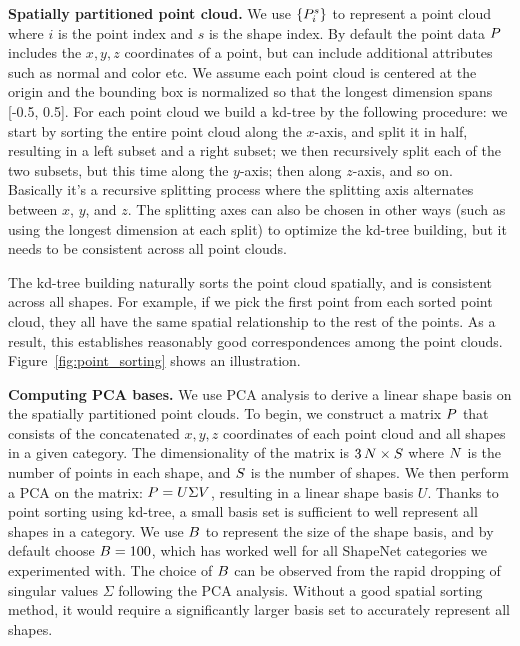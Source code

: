 \vspace{4pt}
\noindent \textbf{Spatially partitioned point cloud.} We use $\{P_i^s\}$ to represent a point cloud where $i$ is the point index and $s$ is the shape index. By default the point data $P$ includes the $x,y,z$ coordinates of a point, but can include additional attributes such as normal and color etc. We assume each point cloud is centered at the origin and the bounding box is normalized so that the longest dimension spans [-0.5, 0.5]. For each point cloud we build a kd-tree by the following procedure: we start by sorting the entire point cloud along the $x$-axis, and split it in half, resulting in a left subset and a right subset; we then recursively split each of the two subsets, but this time along the $y$-axis; then along $z$-axis, and so on. Basically it's a recursive splitting process where the splitting axis alternates between $x$, $y$, and $z$. The splitting axes can also be chosen in other ways (such as using the longest dimension at each split) to optimize the kd-tree building, but it needs to be consistent across all point clouds.

The kd-tree building naturally sorts the point cloud spatially, and is consistent across all shapes. For example, if we pick the first point from each sorted point cloud, they all have the same spatial relationship to the rest of the points. As a result, this establishes reasonably good correspondences among the point clouds. Figure~\ref{fig:point_sorting} shows an illustration.

\noindent \textbf{Computing PCA bases.} We use PCA analysis to derive a linear shape basis on the spatially partitioned point clouds. To begin, we construct a matrix $P$ that consists of the concatenated $x,y,z$ coordinates of each point cloud and all shapes in a given category. The dimensionality of the matrix is $3\,N\times S$ where $N$ is the number of points in each shape, and $S$ is the number of shapes. We then perform a PCA on the matrix: $P=U \Sigma V$, resulting in a linear shape basis $U$. Thanks to point sorting using kd-tree, a small basis set is sufficient to well represent all shapes in a category. We use $B$ to represent the size of the shape basis, and by default choose $B=100$, which has worked well for all ShapeNet categories we experimented with. The choice of $B$ can be observed from the rapid dropping of singular values $\Sigma$ following the PCA analysis. Without a good spatial sorting method, it would require a significantly larger basis set to accurately represent all shapes.

